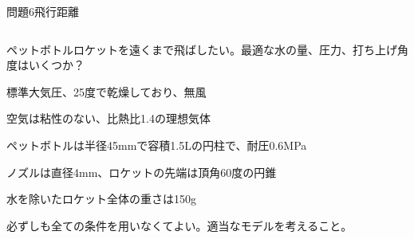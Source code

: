 \documentclass[dvipdfmx]{beamer}
\newenvironment{wideitemize}{\itemize\setlength{\itemsep}{1em}}{\enditemize}
\newenvironment{wideitemize2}{\itemize\setlength{\itemsep}{0.2em}}{\enditemize}
\begin{document}
\begin{frame}{問題6}{飛行距離}
\begin{columns}[t]
\begin{column}{0.7\textwidth}
\begin{wideitemize}
	\item ペットボトルロケットを遠くまで飛ばしたい。最適な水の量、圧力、打ち上げ角度はいくつか？
	\begin{wideitemize2}
		\item 標準大気圧、25度で乾燥しており、無風
		\item 空気は粘性のない、比熱比1.4の理想気体
		\item ペットボトルは半径45mmで容積1.5Lの円柱で、耐圧0.6MPa
		\item ノズルは直径4mm、ロケットの先端は頂角60度の円錐
		\item 水を除いたロケット全体の重さは150g
		\item 必ずしも全ての条件を用いなくてよい。適当なモデルを考えること。
	\end{wideitemize2}
\end{wideitemize}


\end{column}
\end{columns}
\end{frame}
\end{document}
